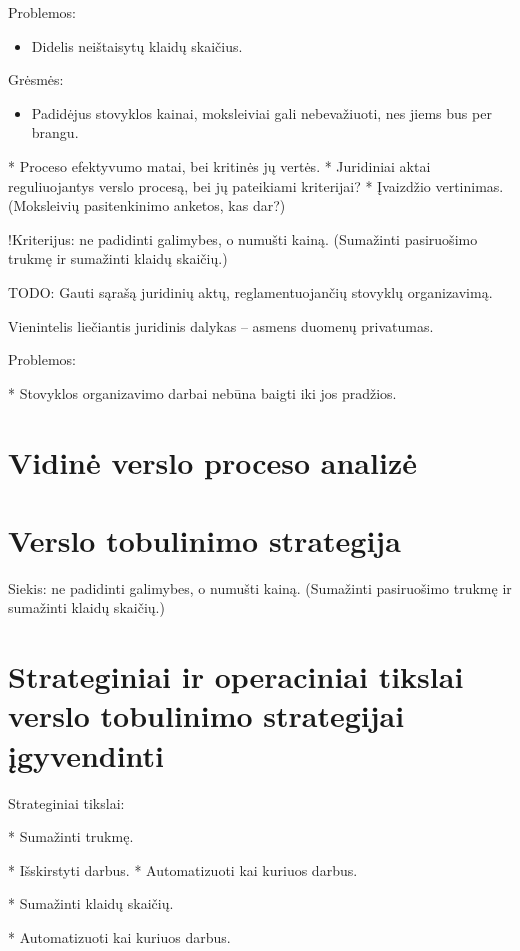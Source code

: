 Problemos:

\begin{itemize}
  \item Didelis neištaisytų klaidų skaičius.
\end{itemize}

Grėsmės:
\begin{itemize}
  \item Padidėjus stovyklos kainai, moksleiviai gali nebevažiuoti, nes 
    jiems bus per brangu.
\end{itemize}

* Proceso efektyvumo matai, bei kritinės jų vertės.
* Juridiniai aktai reguliuojantys verslo procesą, bei jų pateikiami 
  kriterijai?
* Įvaizdžio vertinimas. (Moksleivių pasitenkinimo anketos, kas dar?)


!Kriterijus: ne padidinti galimybes, o numušti kainą. (Sumažinti 
pasiruošimo trukmę ir sumažinti klaidų skaičių.)

TODO: Gauti sąrašą juridinių aktų, reglamentuojančių stovyklų organizavimą.

Vienintelis liečiantis juridinis dalykas – asmens duomenų privatumas.

Problemos:

* Stovyklos organizavimo darbai nebūna baigti iki jos pradžios.


\section{Vidinė verslo proceso analizė}

\section{Verslo tobulinimo strategija}

Siekis: ne padidinti galimybes, o numušti kainą. (Sumažinti 
pasiruošimo trukmę ir sumažinti klaidų skaičių.)


\section{Strateginiai ir operaciniai tikslai verslo tobulinimo %
  strategijai įgyvendinti}

Strateginiai tikslai:

* Sumažinti trukmę.

  * Išskirstyti darbus.
  * Automatizuoti kai kuriuos darbus.

* Sumažinti klaidų skaičių.

  * Automatizuoti kai kuriuos darbus.
